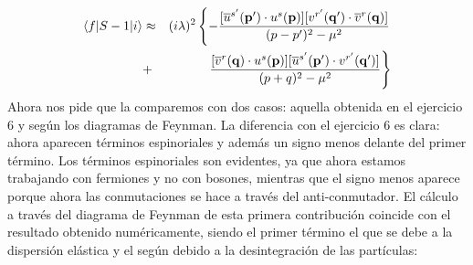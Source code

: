 \begin{solucion}
	\begin{eqnarray*}
		\mel**{f}{S-1}{i}  & \approx & (i\lambda)^2 \left\{ -\frac{[\overline{u}^{s'}(\mathbf{p}') \cdot u^{s}(\mathbf{p})]  [v^{r'}(\mathbf{q}') \cdot \overline{v}^{r}(\mathbf{q})]}{(p-p')^2 - \mu^2} \right. \\ & + &  \left. \frac{[\overline{v}^{r}(\mathbf{q}) \cdot u^{s}(\mathbf{p})] [\overline{u}^{s'}(\mathbf{p}') \cdot v^{r'}(\mathbf{q}')]}{(p+q)^2 - \mu^2} \right\}
	\end{eqnarray*}	
	Ahora nos pide que la comparemos con dos casos: aquella obtenida en el ejercicio 6 y según los diagramas de Feynman. La diferencia con el ejercicio 6 es clara: ahora aparecen términos espinoriales y además un signo menos delante del primer término. Los términos espinoriales son evidentes, ya que ahora estamos trabajando con fermiones y no con bosones, mientras que el signo menos aparece porque ahora las conmutaciones se hace a través del anti-conmutador. El cálculo a través del diagrama de Feynman de esta primera contribución coincide con el resultado obtenido numéricamente, siendo el primer término el que se debe a la dispersión elástica y el según debido a la desintegración de las partículas:
	
	\begin{center}
	\end{center}
	\begin{center}
	\end{center}
	

\end{solucion}



